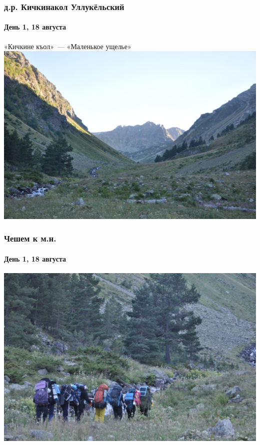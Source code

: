 \begin{frame}
	\frametitle{д.р. Кичкинакол Уллукёльский}
	\framesubtitle{День 1, 18 августа}
	«Кичкине къол»~--- «Маленькое ущелье»
	\centering
	\includegraphics[width=\linewidth]{../pics/DSC_0558}
\end{frame}

\begin{frame}
	\frametitle{Чешем к м.н.}
	\framesubtitle{День 1, 18 августа}
	\centering
	\includegraphics[width=\linewidth]{../pics/DSC_0559}
\end{frame}

